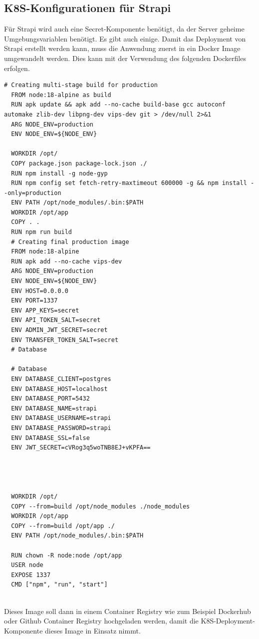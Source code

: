 \subsection{K8S-Konfigurationen für Strapi}
Für Strapi wird auch eine Secret-Komponente benötigt, da der Server geheime Umgebungsvariablen benötigt.
Es gibt auch einige.
Damit das Deployment von Strapi erstellt werden kann, muss die Anwendung zuerst in ein Docker Image umgewandelt werden. Dies kann mit der Verwendung des folgenden Dockerfiles erfolgen.
\begin{lstlisting}[caption=Strapi Dockerfile]
  # Creating multi-stage build for production
  FROM node:18-alpine as build
  RUN apk update && apk add --no-cache build-base gcc autoconf automake zlib-dev libpng-dev vips-dev git > /dev/null 2>&1
  ARG NODE_ENV=production
  ENV NODE_ENV=${NODE_ENV}
  
  WORKDIR /opt/
  COPY package.json package-lock.json ./
  RUN npm install -g node-gyp
  RUN npm config set fetch-retry-maxtimeout 600000 -g && npm install --only=production
  ENV PATH /opt/node_modules/.bin:$PATH
  WORKDIR /opt/app
  COPY . .
  RUN npm run build
  # Creating final production image
  FROM node:18-alpine
  RUN apk add --no-cache vips-dev
  ARG NODE_ENV=production
  ENV NODE_ENV=${NODE_ENV}
  ENV HOST=0.0.0.0
  ENV PORT=1337
  ENV APP_KEYS=secret
  ENV API_TOKEN_SALT=secret
  ENV ADMIN_JWT_SECRET=secret
  ENV TRANSFER_TOKEN_SALT=secret
  # Database
  
  # Database
  ENV DATABASE_CLIENT=postgres
  ENV DATABASE_HOST=localhost
  ENV DATABASE_PORT=5432
  ENV DATABASE_NAME=strapi
  ENV DATABASE_USERNAME=strapi
  ENV DATABASE_PASSWORD=strapi
  ENV DATABASE_SSL=false
  ENV JWT_SECRET=cVRog3q5woTNB8EJ+vKPFA==
  
  
  
  
  WORKDIR /opt/
  COPY --from=build /opt/node_modules ./node_modules
  WORKDIR /opt/app
  COPY --from=build /opt/app ./
  ENV PATH /opt/node_modules/.bin:$PATH
  
  RUN chown -R node:node /opt/app
  USER node
  EXPOSE 1337
  CMD ["npm", "run", "start"]
    
\end{lstlisting}

Dieses Image soll dann in einem Container Registry wie zum Beispiel
Dockerhub oder Github Container Registry hochgeladen werden,
damit die K8S-Deployment-Komponente dieses Image in Einsatz nimmt.




